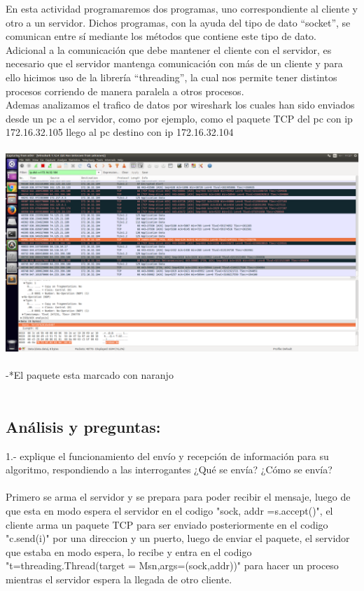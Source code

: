 \documentclass{article}
\begin{document}
En esta actividad programaremos dos programas, uno correspondiente al cliente y otro a un servidor. Dichos programas, con la ayuda del tipo de dato “socket”, se comunican entre sí mediante los métodos que contiene este tipo de dato.
Adicional a la comunicación que debe mantener el cliente con el servidor, es necesario que el servidor mantenga comunicación con más de un cliente y para ello hicimos uso de la librería “threading”, la cual nos permite tener distintos procesos corriendo de manera paralela a otros procesos.
\\
Ademas analizamos el trafico de datos por wireshark los cuales han sido enviados desde un pc a el servidor, como por ejemplo, como el paquete TCP del pc con ip 172.16.32.105 llego al pc destino con ip 172.16.32.104\\\\

\includegraphics[width=1\textwidth]{Wire.png}\\\\
-*El paquete esta marcado con naranjo\\\\

\subsection{Análisis y preguntas:}

1.- explique el funcionamiento del envío y recepción de información para su algoritmo, respondiendo a las interrogantes ¿Qué se envía? ¿Cómo se envía?\\\\

Primero se arma el servidor y se prepara para poder recibir el mensaje, luego de que esta en modo espera el servidor en el codigo "sock, addr =s.accept()", el cliente arma un paquete TCP para ser enviado posteriormente en el codigo "c.send(i)" por una direccion y un puerto, luego de enviar el paquete, el servidor que estaba en modo espera, lo recibe y entra en el codigo "t=threading.Thread(target = Msn,args=(sock,addr))" para hacer un proceso mientras el servidor espera la llegada de otro cliente.\\\\
\end{document}
